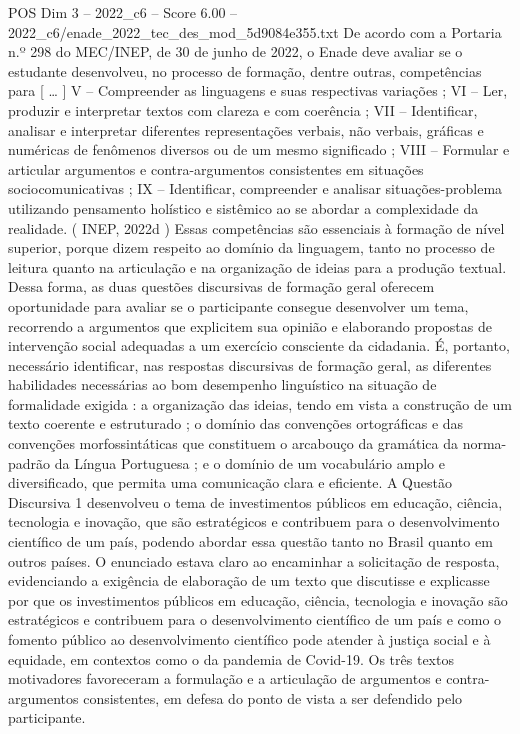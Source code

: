 \begin{textsample}{POS Dim 3 – 2022\_c6 – Score 6.00 – 2022\_c6/enade\_2022\_tec\_des\_mod\_5d9084e355.txt}
De acordo com a Portaria n.º 298 do MEC/INEP, de 30 de junho de 2022, o Enade deve avaliar se o estudante desenvolveu, no processo de formação, dentre outras, competências para [ … ] V – Compreender as linguagens e suas respectivas variações ; VI – Ler, produzir e interpretar textos com clareza e com coerência ; VII – Identificar, analisar e interpretar diferentes representações verbais, não verbais, gráficas e numéricas de fenômenos diversos ou de um mesmo significado ; VIII – Formular e articular argumentos e contra-argumentos consistentes em situações sociocomunicativas ; IX – Identificar, compreender e analisar situações-problema utilizando pensamento holístico e sistêmico ao se abordar a complexidade da realidade. ( INEP, 2022d ) Essas competências são essenciais à formação de nível superior, porque dizem respeito ao domínio da linguagem, tanto no processo de leitura quanto na articulação e na organização de ideias para a produção textual.
Dessa forma, as duas questões discursivas de formação geral oferecem oportunidade para avaliar se o participante consegue desenvolver um tema, recorrendo a argumentos que explicitem sua opinião e elaborando propostas de intervenção social adequadas a um exercício consciente da cidadania.
É, portanto, necessário identificar, nas respostas discursivas de formação geral, as diferentes habilidades necessárias ao bom desempenho linguístico na situação de formalidade exigida : a organização das ideias, tendo em vista a construção de um texto coerente e estruturado ; o domínio das convenções ortográficas e das convenções morfossintáticas que constituem o arcabouço da gramática da norma-padrão da Língua Portuguesa ; e o domínio de um vocabulário amplo e diversificado, que permita uma comunicação clara e eficiente.
A Questão Discursiva 1 desenvolveu o tema de investimentos públicos em educação, ciência, tecnologia e inovação, que são estratégicos e contribuem para o desenvolvimento científico de um país, podendo abordar essa questão tanto no Brasil quanto em outros países.
O enunciado estava claro ao encaminhar a solicitação de resposta, evidenciando a exigência de elaboração de um texto que discutisse e explicasse por que os investimentos públicos em educação, ciência, tecnologia e inovação são estratégicos e contribuem para o desenvolvimento científico de um país e como o fomento público ao desenvolvimento científico pode atender à justiça social e à equidade, em contextos como o da pandemia de Covid-19.
Os três textos motivadores favoreceram a formulação e a articulação de argumentos e contra-argumentos consistentes, em defesa do ponto de vista a ser defendido pelo participante.

\end{textsample}
